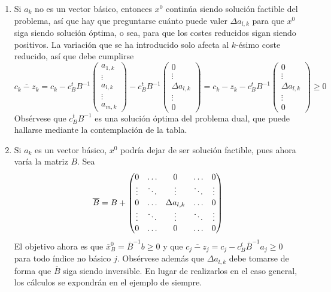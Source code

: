 \documentclass[11pt]{report}
\theoremstyle{mytheorem}
\theoremstyle{mydefinition}
\theoremstyle{myexample}
\begin{document}
\begin{enumerate}
    \item Si $a_k$ no es un vector básico, entonces $x^0$ continúa siendo solución factible del problema, así que hay que preguntarse cuánto puede valer $\Delta a_{l,k}$ para que $x^0$ siga siendo solución óptima, o sea, para que los costes reducidos sigan siendo positivos. La variación que se ha introducido solo afecta al $k$-ésimo coste reducido, así que debe cumplirse
    \[
    \overline{c_k-z_k} = c_k-c_B^tB^{-1}\begin{pmatrix}
        a_{1,k} \\
        \vdots \\
        a_{l,k} \\
        \vdots \\
        a_{m,k}
    \end{pmatrix} - c_B^tB^{-1}\begin{pmatrix}
        0 \\
        \vdots \\
        \Delta a_{l,k} \\
        \vdots \\
        0
    \end{pmatrix}
    = c_k-z_k- c_B^tB^{-1}\begin{pmatrix}
        0 \\
        \vdots \\
        \Delta a_{l,k} \\
        \vdots \\
        0
    \end{pmatrix}  \geq 0
    \]
    Obsérvese que $c_B^tB^{-1}$ es una solución óptima del problema dual, que puede hallarse mediante la contemplación de la tabla.
    \item Si $a_k$ es un vector básico, $x^0$ podría dejar de ser solución factible, pues ahora varía la matriz $B$. Sea
    \[\overline{B} = B + \begin{pmatrix}
        0 & \mathellipsis & 0 & \mathellipsis & 0 \\
        \vdots & \ddots & \vdots & \ddots & \vdots \\
        0 & \mathellipsis & \Delta a_{l,k} & \mathellipsis & 0 \\
        \vdots & \ddots & \vdots & \ddots & \vdots \\
        0& \mathellipsis & 0 & \mathellipsis & 0 \\
    \end{pmatrix}\] El objetivo ahora es que $\overline{x}_B^0 = \overline{B}^{-1}b \geq 0$ y que  $\overline{c_j-z_j} = c_j-c_B^t\overline{B}^{-1}a_j \geq 0$ para todo índice no básico $j$. Obsérvese además que $\Delta a_{l,k}$ debe tomarse de forma que $\overline{B}$ siga siendo inversible. En lugar de realizarlos en el caso general, los cálculos se expondrán en el ejemplo de siempre. 
\end{enumerate}
\end{document}

